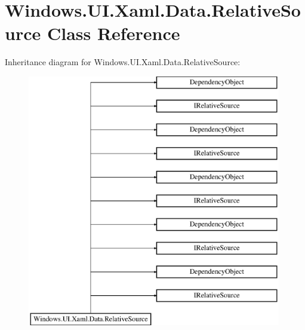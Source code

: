 \hypertarget{class_windows_1_1_u_i_1_1_xaml_1_1_data_1_1_relative_source}{}\section{Windows.\+U\+I.\+Xaml.\+Data.\+Relative\+Source Class Reference}
\label{class_windows_1_1_u_i_1_1_xaml_1_1_data_1_1_relative_source}
Inheritance diagram for Windows.\+U\+I.\+Xaml.\+Data.\+Relative\+Source\+:\begin{figure}[H]
\begin{center}
\leavevmode
\includegraphics[height=11.000000cm]{class_windows_1_1_u_i_1_1_xaml_1_1_data_1_1_relative_source}
\end{center}
\end{figure}
